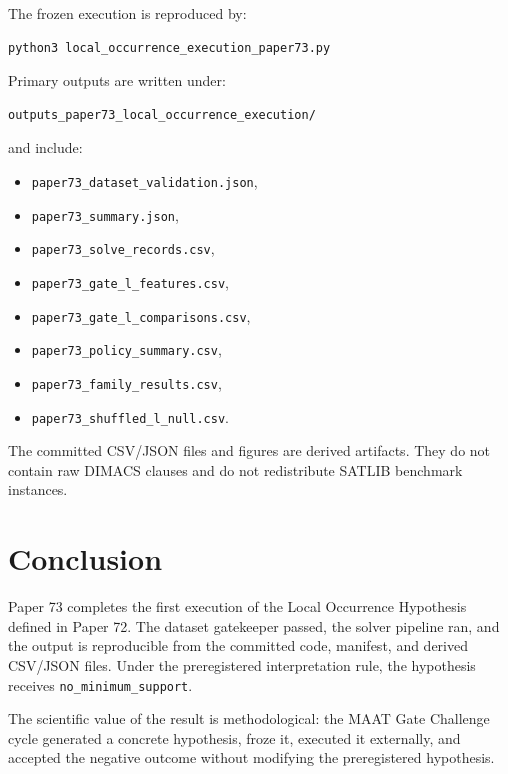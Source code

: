 \documentclass[11pt,a4paper]{article}
\begin{document}
The frozen execution is reproduced by:
\begin{verbatim}
python3 local_occurrence_execution_paper73.py
\end{verbatim}

Primary outputs are written under:
\begin{verbatim}
outputs_paper73_local_occurrence_execution/
\end{verbatim}
and include:
\begin{itemize}
  \item \texttt{paper73\_dataset\_validation.json},
  \item \texttt{paper73\_summary.json},
  \item \texttt{paper73\_solve\_records.csv},
  \item \texttt{paper73\_gate\_l\_features.csv},
  \item \texttt{paper73\_gate\_l\_comparisons.csv},
  \item \texttt{paper73\_policy\_summary.csv},
  \item \texttt{paper73\_family\_results.csv},
  \item \texttt{paper73\_shuffled\_l\_null.csv}.
\end{itemize}

The committed CSV/JSON files and figures are derived artifacts. They do not
contain raw DIMACS clauses and do not redistribute SATLIB benchmark instances.

\section{Conclusion}

Paper 73 completes the first execution of the Local Occurrence Hypothesis
defined in Paper 72. The dataset gatekeeper passed, the solver pipeline ran,
and the output is reproducible from the committed code, manifest, and derived
CSV/JSON files. Under the preregistered interpretation rule, the hypothesis
receives \texttt{no\_minimum\_support}.

The scientific value of the result is methodological: the MAAT Gate Challenge
cycle generated a concrete hypothesis, froze it, executed it externally, and
accepted the negative outcome without modifying the preregistered hypothesis.
\end{document}
